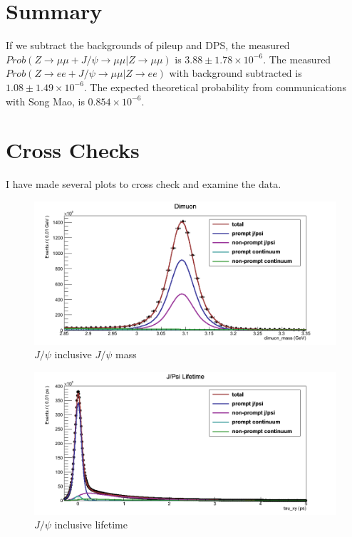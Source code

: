 \documentclass[a4paper,12pt]{article}
\begin{document}
\section{Summary}
If we subtract the backgrounds of pileup and DPS, the measured $Prob(Z\rightarrow\mu\mu + J\slash \psi\rightarrow\mu\mu | Z\rightarrow\mu\mu)$ is $3.88 \pm 1.78 \times 10^{-6}$. The measured $Prob(Z\rightarrow ee + J\slash \psi\rightarrow\mu\mu | Z\rightarrow ee)$ with background subtracted is $1.08 \pm 1.49 \times 10^{-6}$. The expected theoretical probability from communications with Song Mao, is $0.854 \times 10^{-6}$. 

\section{Cross Checks}
I have made several plots to cross check and examine the data. 

\begin{figure}[]
    \centering
      \includegraphics[scale=0.4]{Images/inclusive_jpsi_mass0.png}
  \caption{$J\slash\psi$ inclusive $J\slash\psi$ mass}
\end{figure}
\begin{figure}[]
    \centering
      \includegraphics[scale=0.4]{Images/inclusive_jpsi_tau_xy0.png}
    \caption{$J\slash\psi$ inclusive lifetime}
\end{figure}
\end{document}

